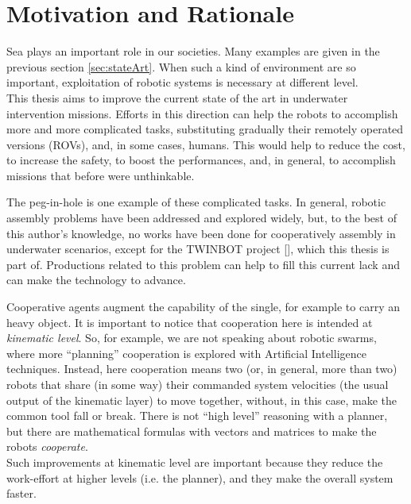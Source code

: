 \section{Motivation and Rationale}
Sea plays an important role in our societies. Many examples are given in the previous section \ref{sec:stateArt}. When such a kind of environment are so important, exploitation of robotic systems is necessary at different level.\\
This thesis aims to improve the current state of the art in underwater intervention missions. Efforts in this direction can help the robots to accomplish more and more complicated tasks, substituting gradually their remotely operated versions (ROVs), and, in some cases, humans. This would help to reduce the cost, to increase the safety, to boost the performances, and, in general, to accomplish missions that before were unthinkable.

The peg-in-hole is one example of these complicated tasks. In general, robotic assembly problems have been addressed and explored widely, but, to the best of this author's knowledge, no works have been done for cooperatively assembly in underwater scenarios, except for the TWINBOT project [\cite{TWINBOT2019}], which this thesis is part of. Productions related to this problem can help to fill this current lack and can make the technology to advance. 

Cooperative agents augment the capability of the single, for example to carry an heavy object. It is important to notice that cooperation here is intended at \textit{kinematic level}. So, for example, we are not speaking about robotic swarms, where more \enquote{planning} cooperation is explored with Artificial Intelligence techniques. Instead, here cooperation means two (or, in general, more than two) robots that share (in some way) their commanded system velocities (the usual output of the kinematic layer) to move together, without, in this case, make the common tool fall or break. There is not \enquote{high level} reasoning with a planner, but there are mathematical formulas with vectors and matrices to make the robots \textit{cooperate}.\\
Such improvements at kinematic level are important because they reduce the work-effort at higher levels (i.e. the planner), and they make the overall system faster.\\


